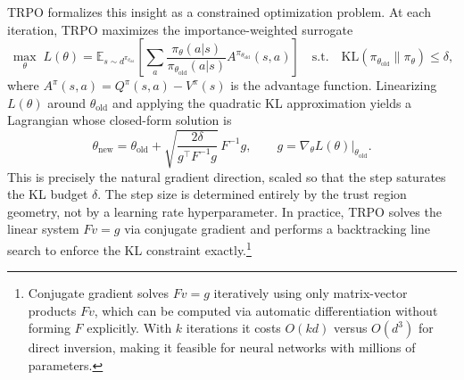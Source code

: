 TRPO formalizes this insight as a constrained optimization problem. At each iteration, TRPO maximizes the importance-weighted surrogate
\begin{equation}
\label{eq:trpo}
\max_\theta \; L(\theta) = \mathbb{E}_{s \sim d^{\pi_{\theta_{\mathrm{old}}}}} \left[ \sum_a \frac{\pi_\theta(a|s)}{\pi_{\theta_{\mathrm{old}}}(a|s)} A^{\pi_{\theta_{\mathrm{old}}}}(s,a) \right] \quad \text{s.t.} \quad \mathrm{KL}(\pi_{\theta_{\mathrm{old}}} \| \pi_\theta) \leq \delta,
\end{equation}
where $A^{\pi}(s,a) = Q^{\pi}(s,a) - V^{\pi}(s)$ is the advantage function. Linearizing $L(\theta)$ around $\theta_{\mathrm{old}}$ and applying the quadratic KL approximation yields a Lagrangian whose closed-form solution is
\begin{equation}
\label{eq:trpo_step}
\theta_{\mathrm{new}} = \theta_{\mathrm{old}} + \sqrt{\frac{2\delta}{g^\top F^{-1} g}} \, F^{-1} g, \qquad g = \nabla_\theta L(\theta)\big|_{\theta_{\mathrm{old}}}.
\end{equation}
This is precisely the natural gradient direction, scaled so that the step saturates the KL budget $\delta$. The step size is determined entirely by the trust region geometry, not by a learning rate hyperparameter. In practice, TRPO solves the linear system $F v = g$ via conjugate gradient and performs a backtracking line search to enforce the KL constraint exactly.\footnote{Conjugate gradient solves $Fv = g$ iteratively using only matrix-vector products $Fv$, which can be computed via automatic differentiation without forming $F$ explicitly. With $k$ iterations it costs $O(kd)$ versus $O(d^3)$ for direct inversion, making it feasible for neural networks with millions of parameters.}

